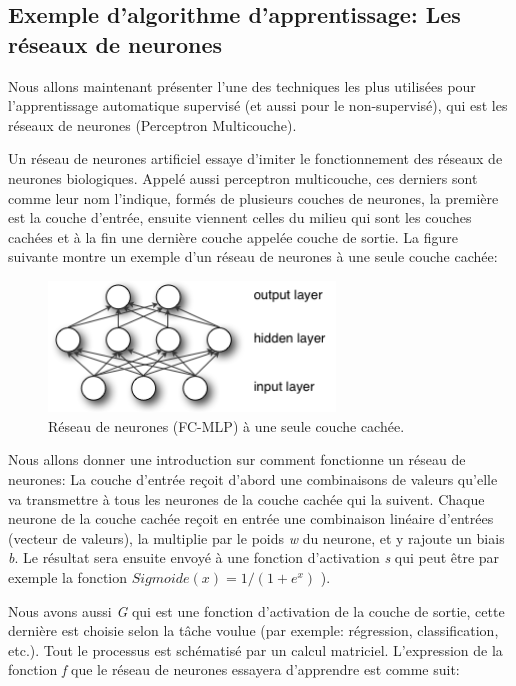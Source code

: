 \subsection{Exemple d'algorithme d'apprentissage: Les réseaux de neurones}
	
	Nous allons maintenant présenter l'une des techniques les plus utilisées pour l'apprentissage automatique supervisé (et aussi pour le non-supervisé), qui est les réseaux de neurones (Perceptron Multicouche).
	
	Un réseau de neurones artificiel essaye d'imiter le fonctionnement des réseaux de neurones biologiques. Appelé aussi perceptron multicouche, ces derniers sont comme leur nom l'indique, formés de plusieurs couches de neurones, la première est la couche d'entrée, ensuite viennent celles du milieu qui sont les couches cachées et à la fin une dernière couche appelée couche de sortie. La figure suivante montre un exemple d'un réseau de neurones à une seule couche cachée:


\begin{figure}[H]
	\centering
		\includegraphics[width=3in]{Figures/mlp.png}
	\caption[An Electron]{Réseau de neurones (FC-MLP) à une seule couche cachée.}
	\label{fig:Electron}
\end{figure}

	Nous allons donner une introduction sur comment fonctionne un réseau de neurones: La couche d'entrée reçoit d'abord une combinaisons de valeurs qu'elle va transmettre à tous les neurones de la couche cachée qui la suivent. Chaque neurone de la couche cachée reçoit en entrée une combinaison linéaire d'entrées (vecteur de valeurs), la multiplie par le poids \textit{w} du neurone, et y rajoute un biais \textit{b}. Le résultat sera ensuite envoyé à une fonction d'activation \textit{s} qui peut être par exemple la fonction $Sigmoide(x) = 1/(1+e^{x})$ ).
	
	Nous avons aussi \textit{G} qui est une fonction d'activation de la couche de sortie, cette dernière est choisie selon la tâche voulue (par exemple: régression, classification, etc.).
Tout le processus est schématisé par un calcul matriciel. L’expression de la fonction \textit{f} que le réseau de neurones essayera d'apprendre est comme suit:

